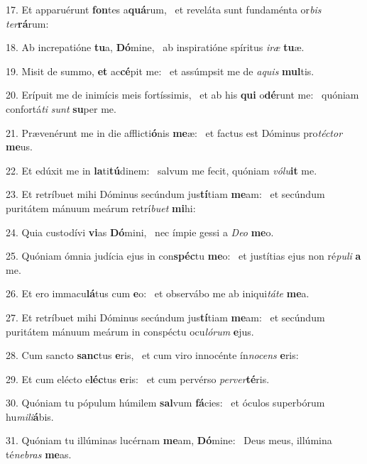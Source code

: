 17. Et apparuérunt \textbf{fon}tes a\textbf{quá}rum, \ast\  et reveláta sunt fundaménta or\textit{bis} \textit{ter}\textbf{rá}rum:\

18. Ab increpatióne \textbf{tu}a, \textbf{Dó}mine, \ast\  ab inspiratióne spíritus \textit{i}\textit{ræ} \textbf{tu}æ.\

19. Misit de summo, \textbf{et} ac\textbf{cé}pit me: \ast\  et assúmpsit me de \textit{a}\textit{quis} \textbf{mul}tis.\

20. Erípuit me de inimícis meis fortíssimis, \dag\  et ab his \textbf{qui} o\textbf{dé}runt me: \ast\  quóniam confortá\textit{ti} \textit{sunt} \textbf{su}per me.\

21. Prævenérunt me in die afflicti\textbf{ó}nis \textbf{me}æ: \ast\  et factus est Dóminus pro\textit{téc}\textit{tor} \textbf{me}us.\

22. Et edúxit me in \textbf{la}ti\textbf{tú}dinem: \ast\  salvum me fecit, quóniam \textit{vó}\textit{lu}\textbf{it} me.\

23. Et retríbuet mihi Dóminus secúndum jus\textbf{tí}tiam \textbf{me}am: \ast\  et secúndum puritátem mánuum meárum retrí\textit{bu}\textit{et} \textbf{mi}hi:\

24. Quia custodívi \textbf{vi}as \textbf{Dó}mini, \ast\  nec ímpie gessi a \textit{De}\textit{o} \textbf{me}o.\

25. Quóniam ómnia judícia ejus in con\textbf{spéc}tu \textbf{me}o: \ast\  et justítias ejus non ré\textit{pu}\textit{li} \textbf{a} me.\

26. Et ero immacu\textbf{lá}tus cum \textbf{e}o: \ast\  et observábo me ab iniqui\textit{tá}\textit{te} \textbf{me}a.\

27. Et retríbuet mihi Dóminus secúndum jus\textbf{tí}tiam \textbf{me}am: \ast\  et secúndum puritátem mánuum meárum in conspéctu ocu\textit{ló}\textit{rum} \textbf{e}jus.\

28. Cum sancto \textbf{sanc}tus \textbf{e}ris, \ast\  et cum viro innocénte ín\textit{no}\textit{cens} \textbf{e}ris:\

29. Et cum elécto e\textbf{léc}tus \textbf{e}ris: \ast\  et cum pervérso \textit{per}\textit{ver}\textbf{té}ris.\

30. Quóniam tu pópulum húmilem \textbf{sal}vum \textbf{fá}cies: \ast\  et óculos superbórum hu\textit{mi}\textit{li}\textbf{á}bis.\

31. Quóniam tu illúminas lucérnam \textbf{me}am, \textbf{Dó}mine: \ast\  Deus meus, illúmina té\textit{ne}\textit{bras} \textbf{me}as.\

